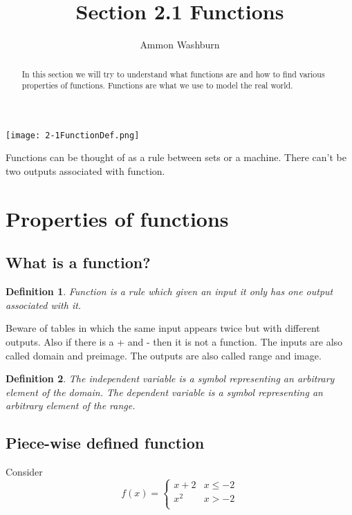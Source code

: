 \documentclass{tufte-handout}
\title{Section 2.1 Functions}
\author[AW]{Ammon Washburn}
\newtheorem{mydef}{Definition}
\begin{document}
\maketitle

\begin{abstract}
In this section we will try to understand what functions are and how to find various properties of functions.  Functions are what we use to model the real world. 
\end{abstract}
\begin{marginfigure}
  \texttt{[image: 2-1FunctionDef.png]}
  \caption{Functions can be thought of as a rule between sets or a machine.  There can't be two outputs associated with function.}
  \label{fig:functionsets}
\end{marginfigure}
\section{ Properties of functions}
\subsection{What is a function?}
\begin{mydef}
Function is a rule which given an input it only has one output associated with it.
\end{mydef} 
Beware of tables in which the same input appears twice but with different outputs.  Also if there is a + and - then it is not a function.  The inputs are also called domain and preimage.  The outputs are also called range and image.
\begin{mydef}
The independent variable is a symbol representing an arbitrary element of the domain.  The dependent variable is a symbol representing an arbitrary element of the range.
\end{mydef}

\subsection{Piece-wise defined function}
Consider
\[
f(x) = \begin{cases}
x+2 & x \leq -2 \\
x^2 & x > -2 \\

\end{cases}
\]
\end{document}
